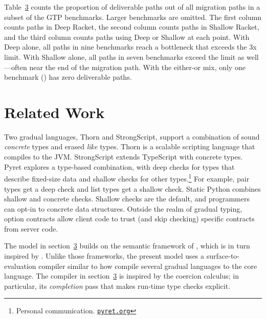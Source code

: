 \documentclass[screen=true, natbib=false, 10pt, sigplan]{acmart}
\newcommand{\sectionNewpage}{}
\newcommand{\ChapRef}[2]{\SecRef{#1}{#2}}
\newcommand{\SecRef}[2]{section~#1}
\newcommand{\SectionNumberLink}[2]{\hyperref[#1]{#2}}
\newcommand{\Scribtexttt}[1]{{\texttt{#1}}}
\let\SOriginalthesubsection\thesubsection
\newcommand{\Ssection}[2]{\section[#1]{#2}\let\thesubsection\SOriginalthesubsection}
\newcommand{\FigureRef}[2]{#1}
\newcommand{\NoteBox}[1]{\footnote{#1}}
\newcommand{\NoteContent}[1]{#1}
\begin{document}
Table~\hyperref[t:x28counter_x28x22figurex22_x22figx3abothx3amixedx2dpathx22x29x29]{\FigureRef{3}{t:x28counter_x28x22figurex22_x22figx3abothx3amixedx2dpathx22x29x29}} counts the proportion of deliverable
paths out of all  migration paths in a subset of the GTP benchmarks.
Larger benchmarks are omitted.
The first column counts paths in Deep Racket,
the second column counts paths in Shallow Racket, and
the third column counts paths using Deep or Shallow at each point.
With Deep alone, all paths in nine
benchmarks reach a bottleneck that exceeds the 3x limit.
With Shallow alone, all paths in seven benchmarks
 exceed the limit as well{---}often near the end of the migration path.
With the either{-}or mix, only one benchmark ()
 has zero deliverable paths.

\sectionNewpage

\Ssection{Related Work}{Related Work}\label{t:x28part_x22secx3arelatedx22x29}

Two gradual languages, Thorn and
StrongScript, support a combination of sound
\emph{concrete} types and erased \emph{like} types.
Thorn is a scalable scripting language that compiles to the JVM.
StrongScript extends TypeScript with concrete types.
Pyret explores a type{-}based combination, with deep checks for types that
describe fixed{-}size data and shallow checks for other types.\NoteBox{\NoteContent{Personal
communication.  \href{https://www.pyret.orgpyret.org}{\Scribtexttt{pyret{\hbox{\texttt{.}}}org}}}}
For example, pair types get a deep check and list types get a shallow
check.
Static Python combines shallow and concrete checks.
Shallow checks are the default, and programmers can opt{-}in to concrete
data structures.
Outside the realm of gradual typing, option contracts allow client code to trust
(and skip checking) specific contracts from server code.

The model in \ChapRef{\SectionNumberLink{t:x28part_x22secx3amodelx22x29}{3}}{Model and Metatheory} builds on the semantic framework
of , which is in turn inspired by
.
Unlike those frameworks, the present model uses a surface{-}to{-}evaluation compiler
similar to how  compile several gradual languages to
the \relax{\kafka} core language.
The compiler in \ChapRef{\SectionNumberLink{t:x28part_x22secx3amodelx22x29}{3}}{Model and Metatheory} is inspired by the coercion calculus;
in particular, its \emph{completion} pass that makes run{-}time type checks explicit.
\end{document}
